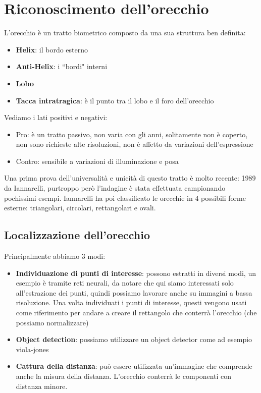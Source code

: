 \documentclass{article}
\begin{document}
\section{Riconoscimento dell'orecchio}
L'orecchio è un tratto biometrico composto da una sua struttura ben definita:
\begin{itemize}
    \item \textbf{Helix}: il bordo esterno
    \item \textbf{Anti-Helix}: i ``bordi" interni
    \item \textbf{Lobo}
    \item \textbf{Tacca intratragica}: è il punto tra il lobo e il foro dell'orecchio 
\end{itemize}

Vediamo i lati positivi e negativi:
\begin{itemize}
    \item Pro: è un tratto passivo, non varia con gli anni, solitamente non è coperto, non sono richieste alte risoluzioni, non è affetto da variazioni dell'espressione
    \item Contro: sensibile a variazioni di illuminazione e posa
\end{itemize}

Una prima prova dell'universalità e unicità di questo tratto è molto recente: 1989 da Iannarelli, purtroppo però l'indagine è stata effettuata campionando pochissimi esempi.
Iannarelli ha poi classificato le orecchie in 4 possibili forme esterne: triangolari, circolari, rettangolari e ovali.

\subsection{Localizzazione dell'orecchio}
Principalmente abbiamo 3 modi:
\begin{itemize}
    \item \textbf{Individuazione di punti di interesse}: possono estratti in diversi modi, un esempio è tramite reti neurali, da notare che qui siamo interessati solo all'estrazione dei punti, quindi possiamo lavorare anche su immagini a bassa risoluzione. Una volta individuati i punti di interesse, questi vengono usati come riferimento per andare a creare il rettangolo che conterrà l'orecchio (che possiamo normalizzare)
    \item \textbf{Object detection}: possiamo utilizzare un object detector come ad esempio viola-jones
    \item \textbf{Cattura della distanza}: può essere utilizzata un'immagine che comprende anche la misura della distanza. L'orecchio conterrà le componenti con distanza minore.
\end{itemize}
\end{document}
